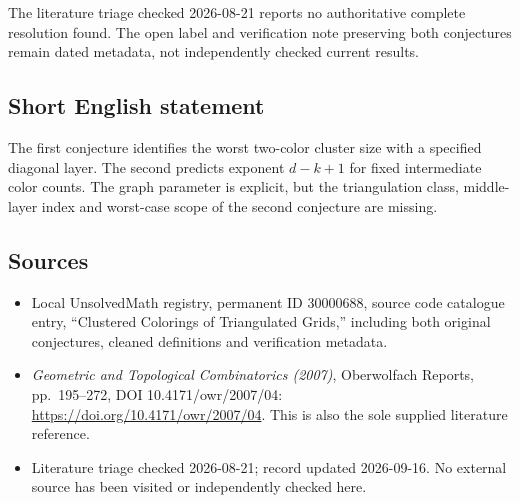 \documentclass[11pt]{article}
\begin{document}
The literature triage checked 2026-08-21 reports no authoritative complete resolution found. The open label and verification note preserving both conjectures remain dated metadata, not independently checked current results.
\subsection{Short English statement}
The first conjecture identifies the worst two-color cluster size with a specified diagonal layer. The second predicts exponent \(d-k+1\) for fixed intermediate color counts. The graph parameter is explicit, but the triangulation class, middle-layer index and worst-case scope of the second conjecture are missing.
\subsection{Sources}
\begin{itemize}
\item Local UnsolvedMath registry, permanent ID 30000688, source code catalogue entry, ``Clustered Colorings of Triangulated Grids,'' including both original conjectures, cleaned definitions and verification metadata.
\item \emph{Geometric and Topological Combinatorics (2007)}, Oberwolfach Reports, pp.\ 195--272, DOI 10.4171/owr/2007/04: \url{https://doi.org/10.4171/owr/2007/04}. This is also the sole supplied literature reference.
\item Literature triage checked 2026-08-21; record updated 2026-09-16. No external source has been visited or independently checked here.
\end{itemize}
\end{document}
